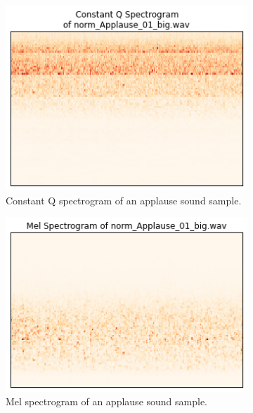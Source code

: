 \documentclass{sig-alternate-05-2015}
\begin{document}
  \begin{figure}[hbt!]
    \centering
    \begin{subfigure}[b]{0.3\textwidth}
      \centering
      \includegraphics[width=\textwidth]{figures/cqt_applause.png}
      \caption{Constant Q spectrogram of an applause sound sample.}
      \label{fig:cqt-applause}
    \end{subfigure}
    \hfill 
    \begin{subfigure}[b]{0.3\textwidth}
      \centering
      \includegraphics[width=\textwidth]{figures/mel_applause.png}
      \caption{Mel spectrogram of an applause sound sample.}
      \label{fig:cqt-applause}
    \end{subfigure}
        \hfill 
    \begin{subfigure}[b]{0.3\textwidth}

\end{subfigure}
\end{figure}
\end{document}
